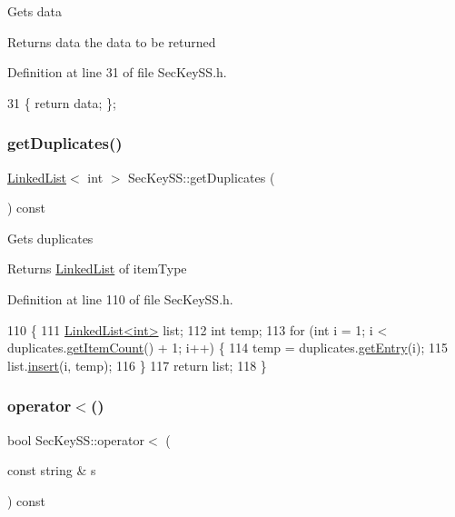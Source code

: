 Gets data \begin{DoxyReturn}{Returns}
data the data to be returned 
\end{DoxyReturn}


Definition at line 31 of file Sec\+Key\+S\+S.\+h.


\begin{DoxyCode}
31 \{ \textcolor{keywordflow}{return} data; \};
\end{DoxyCode}
\mbox{\label{classSecKeySS_aaae9db891cfcdc3f78d8a44145f4f08c}} 
\subsubsection{\texorpdfstring{get\+Duplicates()}{getDuplicates()}}
{\footnotesize\ttfamily \hyperlink{classLinkedList}{Linked\+List}$<$ int $>$ Sec\+Key\+S\+S\+::get\+Duplicates (\begin{DoxyParamCaption}{ }\end{DoxyParamCaption}) const}

Gets duplicates \begin{DoxyReturn}{Returns}
\hyperlink{classLinkedList}{Linked\+List} of item\+Type 
\end{DoxyReturn}


Definition at line 110 of file Sec\+Key\+S\+S.\+h.


\begin{DoxyCode}
110                                               \{
111     \hyperlink{classLinkedList}{LinkedList<int>} list;
112     \textcolor{keywordtype}{int} temp;
113     \textcolor{keywordflow}{for} (\textcolor{keywordtype}{int} i = 1; i < duplicates.\hyperlink{classLinkedList_afc6635f854f48f2f126cf3b60d845220}{getItemCount}() + 1; i++) \{
114         temp = duplicates.\hyperlink{classLinkedList_a341bfd7772c9d24d29eb7a7f3936915b}{getEntry}(i);
115         list.\hyperlink{classLinkedList_ae8a19375505e87e2e4fc0e9b5afe4d4d}{insert}(i, temp);
116     \}
117     \textcolor{keywordflow}{return} list;
118 \}
\end{DoxyCode}
\mbox{\label{classSecKeySS_a78079357a58189d507415df5200fa1de}} 
\subsubsection{\texorpdfstring{operator$<$()}{operator<()}\hspace{0.1cm}{\footnotesize\ttfamily [1/2]}}
{\footnotesize\ttfamily bool Sec\+Key\+S\+S\+::operator$<$ (\begin{DoxyParamCaption}\item[{const string \&}]{s }\end{DoxyParamCaption}) const\hspace{0.3cm}{\ttfamily [inline]}}

